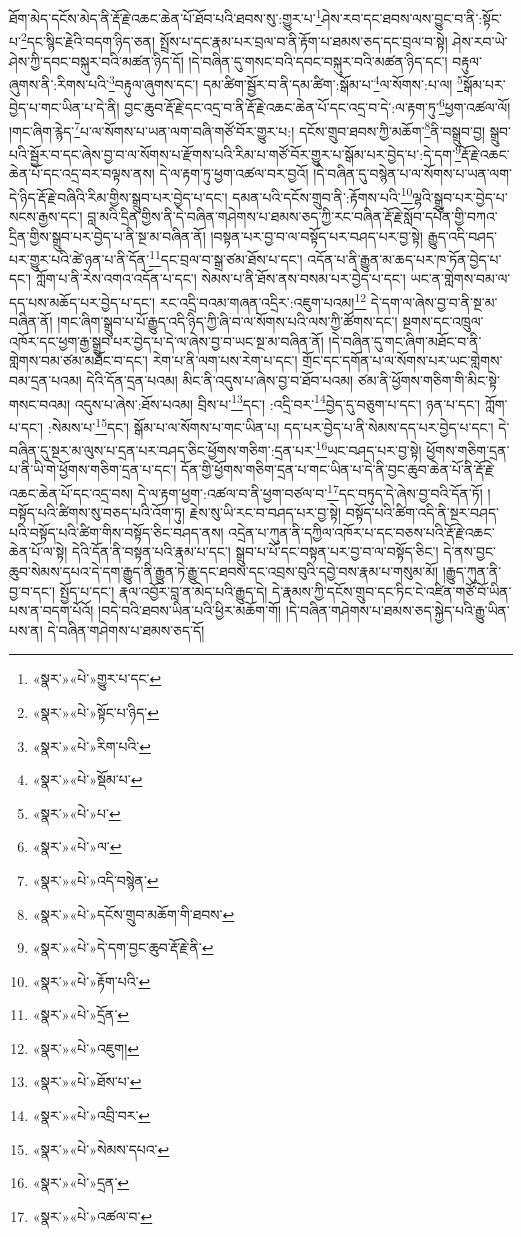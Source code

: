 ཐོག་མེད་དངོས་མེད་ནི་རྡོ་རྗེ་འཆང་ཆེན་པོ་ཐོབ་པའི་ཐབས་སུ་:གྱུར་པ་\footnote{«སྣར་»«པེ་»གྱུར་པ་དང་}ཤེས་རབ་དང་ཐབས་ལས་བྱུང་བ་ནི་:སྟོང་པ་\footnote{«སྣར་»«པེ་»སྟོང་པ་ཉིད་}དང་སྙིང་རྗེའི་བདག་ཉིད་ཅན། སྤྲོས་པ་དང་རྣམ་པར་བྲལ་བ་ནི་རྟོག་པ་ཐམས་ཅད་དང་བྲལ་བ་སྟེ། ཤེས་རབ་ཡེ་ཤེས་ཀྱི་དབང་བསྐུར་བའི་མཚན་ཉིད་དོ། །དེ་བཞིན་དུ་གསང་བའི་དབང་བསྐུར་བའི་མཚན་ཉིད་དང་། བརྟུལ་ཞུགས་ནི་:རིགས་པའི་\footnote{«སྣར་»«པེ་»རིག་པའི་}བརྟུལ་ཞུགས་དང་། དམ་ཚིག་སྦྱོར་བ་ནི་དམ་ཚིག་:སྒོམ་པ་\footnote{«སྣར་»«པེ་»སྡོམ་པ་}ལ་སོགས་:པ་ལ། \footnote{«སྣར་»«པེ་»པ་}སྒོམ་པར་བྱེད་པ་གང་ཡིན་པ་དེ་ནི། བྱང་ཆུབ་རྡོ་རྗེ་དང་འདྲ་བ་ནི་རྡོ་རྗེ་འཆང་ཆེན་པོ་དང་འདྲ་བ་དེ་:ལ་རྟག་ཏུ་\footnote{«སྣར་»«པེ་»ལ་}ཕྱག་འཚལ་ལོ། །གང་ཞིག་རྙེད་\footnote{«སྣར་»«པེ་»འདི་བསྙེན་}པ་ལ་སོགས་པ་ཡན་ལག་བཞི་གཙོ་བོར་གྱུར་པ:། དངོས་གྲུབ་ཐབས་ཀྱི་མཆོག་\footnote{«སྣར་»«པེ་»དངོས་གྲུབ་མཆོག་གི་ཐབས་}ནི་བསྒྲུབ་བྱ། སྒྲུབ་པའི་སྦྱོར་བ་དང་ཞེས་བྱ་བ་ལ་སོགས་པ་རྫོགས་པའི་རིམ་པ་གཙོ་བོར་གྱུར་པ་སྒོམ་པར་བྱེད་པ་:དེ་དག་\footnote{«སྣར་»«པེ་»དེ་དག་བྱང་ཆུབ་རྡོ་རྗེ་ནི་}རྡོ་རྗེ་འཆང་ཆེན་པོ་དང་འདྲ་བར་བལྟས་ནས། དེ་ལ་རྟག་ཏུ་ཕྱག་འཚལ་བར་བྱའོ། །དེ་བཞིན་དུ་བསྙེན་པ་ལ་སོགས་པ་ཡན་ལག་དེ་ཉིད་རྡོ་རྗེ་བཞིའི་རིམ་གྱིས་སྒྲུབ་པར་བྱེད་པ་དང་། དམན་པའི་དངོས་གྲུབ་ནི་:རྟོགས་པའི་\footnote{«སྣར་»«པེ་»རྟོག་པའི་}ལྷའི་སྒྲུབ་པར་བྱེད་པ་སངས་རྒྱས་དང་། བླ་མའི་དྲིན་གྱིས་ནི་དེ་བཞིན་གཤེགས་པ་ཐམས་ཅད་ཀྱི་རང་བཞིན་རྡོ་རྗེ་སློབ་དཔོན་གྱི་བཀའ་དྲིན་གྱིས་སྒྲུབ་པར་བྱེད་པ་ནི་སྔ་མ་བཞིན་ནོ། །བསྟན་པར་བྱ་བ་ལ་བསྟོད་པར་བཤད་པར་བྱ་སྟེ། རྒྱུད་འདི་བཤད་པར་གྱུར་པའི་ཚེ་ཉན་པ་ནི་དོན་\footnote{«སྣར་»«པེ་»དྲོན་}དང་བྲལ་བ་སྒྲ་ཙམ་ཐོས་པ་དང་། འདོན་པ་ནི་རྒྱུན་མ་ཆད་པར་ཁ་ཏོན་བྱེད་པ་དང་། ཀློག་པ་ནི་རེས་འགའ་འདོན་པ་དང་། སེམས་པ་ནི་ཐོས་ནས་བསམ་པར་བྱེད་པ་དང་། ཡང་ན་གླེགས་བམ་ལ་དད་པས་མཆོད་པར་བྱེད་པ་དང་། རང་འདྲི་བའམ་གཞན་འདྲིར་:འཇུག་པའམ།\footnote{«སྣར་»«པེ་»འཇུག།} དེ་དག་ལ་ཞེས་བྱ་བ་ནི་སྔ་མ་བཞིན་ནོ། །གང་ཞིག་སྒྲུབ་པ་པོ་རྒྱུད་འདི་ཉིད་ཀྱི་ཞི་བ་ལ་སོགས་པའི་ལས་ཀྱི་ཚོགས་དང་། སྔགས་དང་འཁྲུལ་འཁོར་དང་ཕྱག་རྒྱ་སྒྲུབ་པར་བྱེད་པ་དེ་ལ་ཞེས་བྱ་བ་ཡང་སྔ་མ་བཞིན་ནོ། །དེ་བཞིན་དུ་གང་ཞིག་མཐོང་བ་ནི་གླེགས་བམ་ཙམ་མཐོང་བ་དང་། རེག་པ་ནི་ལག་པས་རེག་པ་དང་། གྲོང་དང་དགོན་པ་ལ་སོགས་པར་ཡང་གླེགས་བམ་དྲན་པའམ། དེའི་དོན་དྲན་པའམ། མིང་ནི་འདུས་པ་ཞེས་བྱ་བ་ཐོབ་པའམ། ཙམ་ནི་ཕྱོགས་གཅིག་གི་མིང་སྟེ་གསང་བའམ། འདུས་པ་ཞེས་:ཐོས་པའམ། བྲིས་པ་\footnote{«སྣར་»«པེ་»ཐོས་པ་}དང་། :འདྲི་བར་\footnote{«སྣར་»«པེ་»འབྲི་བར་}བྱེད་དུ་བཅུག་པ་དང་། ཉན་པ་དང་། ཀློག་པ་དང་། :སེམས་པ་\footnote{«སྣར་»«པེ་»སེམས་དཔའ་}དང་། སྒོམ་པ་ལ་སོགས་པ་གང་ཡིན་པ། དད་པར་བྱེད་པ་ནི་སེམས་དད་པར་བྱེད་པ་དང་། དེ་བཞིན་དུ་སྔར་མ་ལུས་པ་དྲན་པར་བཤད་ཅིང་ཕྱོགས་གཅིག་:དྲན་པར་\footnote{«སྣར་»«པེ་»དྲན་}ཡང་བཤད་པར་བྱ་སྟེ། ཕྱོགས་གཅིག་དྲན་པ་ནི་ཡི་གེ་ཕྱོགས་གཅིག་དྲན་པ་དང་། དོན་གྱི་ཕྱོགས་གཅིག་དྲན་པ་གང་ཡིན་པ་དེ་ནི་བྱང་ཆུབ་ཆེན་པོ་ནི་རྡོ་རྗེ་འཆང་ཆེན་པོ་དང་འདྲ་བས། དེ་ལ་རྟག་ཕྱག་:འཚལ་བ་ནི་ཕྱག་བཙལ་བ་\footnote{«སྣར་»«པེ་»འཚལ་བ་}དང་བཏུད་དེ་ཞེས་བྱ་བའི་དོན་ཏོ། །བསྟོད་པའི་ཚིགས་སུ་བཅད་པའི་འོག་ཏུ། རྗེས་སུ་ཡི་རང་བ་བཤད་པར་བྱ་སྟེ། བསྟོད་པའི་ཚིག་འདི་ནི་སྔར་བཤད་པའི་བསྟོད་པའི་ཚིག་གིས་བསྟོད་ཅིང་བཤད་ནས། འདྲེན་པ་ཀུན་ནི་དཀྱིལ་འཁོར་པ་དང་བཅས་པའི་རྡོ་རྗེ་འཆང་ཆེན་པོ་ལ་སྟེ། དེའི་དོན་ནི་བསྟན་པའི་རྣམ་པ་དང་། སྒྲུབ་པ་པོ་དང་བསྟན་པར་བྱ་བ་ལ་བསྟོད་ཅིང་། དེ་ནས་བྱང་ཆུབ་སེམས་དཔའ་དེ་དག་རྒྱུད་ནི་རྒྱུན་ཏེ་རྒྱུ་དང་ཐབས་དང་འབྲས་བུའི་དབྱེ་བས་རྣམ་པ་གསུམ་མོ། །རྒྱུད་ཀུན་ནི་བྱ་བ་དང་། སྤྱོད་པ་དང་། རྣལ་འབྱོར་བླ་ན་མེད་པའི་རྒྱུད་དེ། དེ་རྣམས་ཀྱི་དངོས་གྲུབ་དང་ཏིང་ངེ་འཛིན་གཙོ་བོ་ཡིན་པས་ན་བདག་པོའོ། །བདེ་བའི་ཐབས་ཡིན་པའི་ཕྱིར་མཆོག་གོ། །དེ་བཞིན་གཤེགས་པ་ཐམས་ཅད་སྐྱེད་པའི་རྒྱུ་ཡིན་པས་ན། དེ་བཞིན་གཤེགས་པ་ཐམས་ཅད་དོ། 